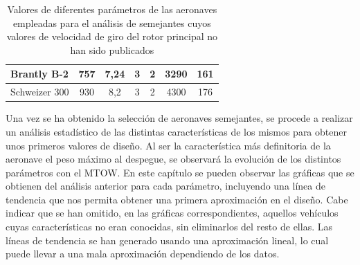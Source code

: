 \begin{table}[htbp]
\begin{tabular}{|l|c|c|c|c|c|c|}
		\hline
		\rowcolor[rgb]{ .949,  .949,  .949} Brantly B-2 & \cellcolor[rgb]{ 1,  1,  1}757 & \cellcolor[rgb]{ 1,  1,  1}7,24 & \cellcolor[rgb]{ 1,  1,  1}3 & \cellcolor[rgb]{ 1,  1,  1}2 & \cellcolor[rgb]{ 1,  1,  1}3290 & \cellcolor[rgb]{ 1,  1,  1}161 \\
		\hline
		\rowcolor[rgb]{ .949,  .949,  .949} Schweizer 300 & \cellcolor[rgb]{ 1,  1,  1}930 & \cellcolor[rgb]{ 1,  1,  1}8,2 & \cellcolor[rgb]{ 1,  1,  1}3 & \cellcolor[rgb]{ 1,  1,  1}2 & \cellcolor[rgb]{ 1,  1,  1}4300 & \cellcolor[rgb]{ 1,  1,  1}176 \\
		\hline
	\end{tabular}%
	\caption{Valores de diferentes parámetros de las aeronaves empleadas para el análisis de semejantes cuyos valores de velocidad de giro del rotor principal no han sido publicados}
	\label{AS}
\end{table}%



Una vez se ha obtenido la selección de aeronaves semejantes, se procede a realizar un análisis estadístico de las distintas características de los mismos para obtener unos primeros valores de diseño. Al ser la característica más definitoria de la aeronave el peso máximo al despegue, se observará la evolución de los distintos parámetros con el MTOW.
En este capítulo se pueden observar las gráficas que se obtienen del análisis anterior para cada parámetro, incluyendo una línea de tendencia que nos permita obtener una primera aproximación en el diseño. Cabe indicar que se han omitido, en las gráficas correspondientes, aquellos vehículos cuyas características no eran conocidas, sin eliminarlos del resto de ellas. Las líneas de tendencia se han generado usando una aproximación lineal, lo cual puede llevar a una mala aproximación dependiendo de los datos.


